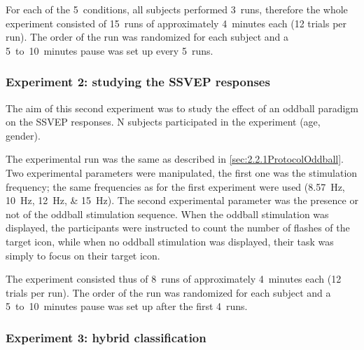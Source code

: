 \documentclass[10pt]{article}
\begin{document}
        For each of the 5~conditions, all subjects performed 3~runs, therefore the whole experiment consisted of 15~runs of approximately 4~minutes each (12 trials per run).
        The order of the run was randomized for each subject and a 5~to~10~minutes pause was set up every 5~runs.


        \subsubsection{Experiment 2: studying the \acs{SSVEP} responses}
        \label{sec:2.2.2ProtocolSSVEP}

        The aim of this second experiment was to study the effect of an oddball paradigm on the \ac{SSVEP} responses.
        N subjects participated in the experiment (age, gender).

        The experimental run was the same as described in \autoref{sec:2.2.1ProtocolOddball}.
        Two experimental parameters were manipulated, the first one was the stimulation frequency; the same frequencies as for the first experiment were used (\SIlist[list-units = single]{8.57;10;12;15}{\Hz}).
        The second experimental parameter was the presence or not of the oddball stimulation sequence.
        When the oddball stimulation was displayed, the participants were instructed to count the number of flashes of the target icon, while when no oddball stimulation was displayed, their task was simply to focus on their target icon.

        The experiment consisted thus of 8~runs of approximately 4~minutes each (12 trials per run).
        The order of the run was randomized for each subject and a 5~to~10~minutes pause was set up after the first 4~runs.


        \subsubsection{Experiment 3: hybrid classification}
        \label{sec:2.2.3ProtocolHybrid}
\end{document}
